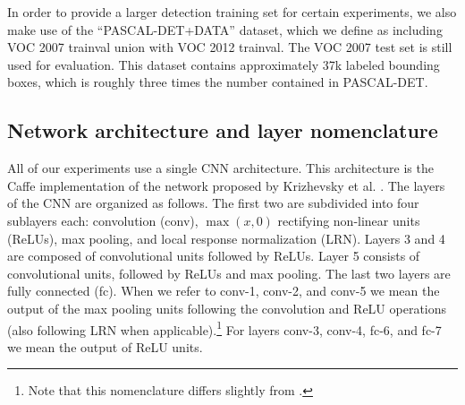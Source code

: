 In order to provide a larger detection training set for certain experiments, we also make use of the ``PASCAL-DET+DATA'' dataset, which we define as including VOC 2007 trainval union with VOC 2012 trainval.
The VOC 2007 test set is still used for evaluation.
This dataset contains approximately 37k labeled bounding boxes, which is roughly three times the number contained in PASCAL-DET.

\subsection{Network architecture and layer nomenclature}
\label{sub:net-arch}
All of our experiments use a single CNN architecture.
This architecture is the Caffe \cite{caffe} implementation of the network proposed by Krizhevsky et al. \cite{Kriz}.
The layers of the CNN are organized as follows.
The first two are subdivided into four sublayers each: convolution (conv), $\max(x,0)$ rectifying non-linear units (ReLUs), max pooling, and local response normalization (LRN). 
Layers 3 and 4 are composed of convolutional units followed by ReLUs.
Layer 5 consists of convolutional units, followed by ReLUs and max pooling.
The last two layers are fully connected (fc). 
When we refer to conv-1, conv-2, and conv-5 we mean the output of the max pooling units following the convolution and ReLU operations (also following LRN when applicable).\footnote{Note that this nomenclature differs slightly from \cite{Rcnn}.}
For layers conv-3, conv-4, fc-6, and fc-7 we mean the output of ReLU units.

 
